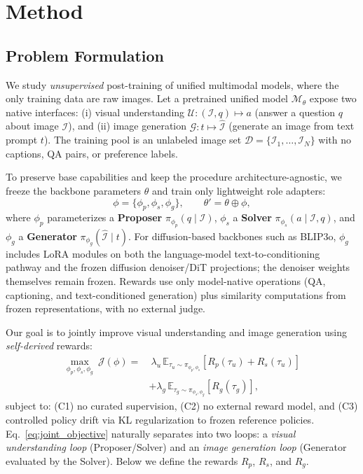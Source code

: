 
\section{Method}
\label{sec:method}

\subsection{Problem Formulation}
\label{sec:problem}

We study \emph{unsupervised} post-training of unified multimodal models, where the only training data are raw images. Let a pretrained unified model $\mathcal{M}_\theta$ expose two native interfaces: (i) visual understanding $\mathcal{U}: (\mathcal{I}, q)\mapsto a$ (answer a question $q$ about image $\mathcal{I}$), and (ii) image generation $\mathcal{G}: t\mapsto \hat{\mathcal{I}}$ (generate an image from text prompt $t$). The training pool is an unlabeled image set $\mathcal{D}=\{\mathcal{I}_1,\ldots,\mathcal{I}_N\}$ with no captions, QA pairs, or preference labels.

To preserve base capabilities and keep the procedure architecture-agnostic, we freeze the backbone parameters $\theta$ and train only lightweight role adapters:
\begin{equation}
    \phi=\{\phi_p,\phi_s,\phi_g\}, \qquad \theta'=\theta\oplus\phi,
    \label{eq:adapted_params}
\end{equation}
where $\phi_p$ parameterizes a \textbf{Proposer} $\pi_{\phi_p}(q\mid\mathcal{I})$, $\phi_s$ a \textbf{Solver} $\pi_{\phi_s}(a\mid\mathcal{I},q)$, and $\phi_g$ a \textbf{Generator} $\pi_{\phi_g}(\hat{\mathcal{I}}\mid t)$. For diffusion-based backbones such as BLIP3o, $\phi_g$ includes LoRA modules on both the language-model text-to-conditioning pathway and the frozen diffusion denoiser/DiT projections; the denoiser weights themselves remain frozen. Rewards use only model-native operations (QA, captioning, and text-conditioned generation) plus similarity computations from frozen representations, with no external judge.

Our goal is to jointly improve visual understanding and image generation using \emph{self-derived} rewards:
\begin{equation}
    \begin{aligned}
        \max_{\phi_p,\phi_s,\phi_g}\ \mathcal{J}(\phi)=
        &\ \lambda_u\,\mathbb{E}_{\tau_u\sim\pi_{\phi_p,\phi_s}}\!\left[R_p(\tau_u)+R_s(\tau_u)\right] \\
        &+ \lambda_g\,\mathbb{E}_{\tau_g\sim\pi_{\phi_s,\phi_g}}\!\left[R_g(\tau_g)\right],
    \end{aligned}
    \label{eq:joint_objective}
\end{equation}
subject to: (C1) no curated supervision, (C2) no external reward model, and (C3) controlled policy drift via KL regularization to frozen reference policies. Eq.~\eqref{eq:joint_objective} naturally separates into two loops: a \emph{visual understanding loop} (Proposer/Solver) and an \emph{image generation loop} (Generator evaluated by the Solver). Below we define the rewards $R_p$, $R_s$, and $R_g$.


